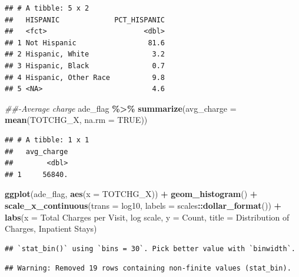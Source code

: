 \documentclass[preprint, 3p,
authoryear]{elsarticle} %
\newenvironment{Shaded}{\begin{snugshade}}{\end{snugshade}}
\newcommand{\CommentTok}[1]{\textcolor[rgb]{0.56,0.35,0.01}{\textit{#1}}}
\newcommand{\DataTypeTok}[1]{\textcolor[rgb]{0.13,0.29,0.53}{#1}}
\newcommand{\KeywordTok}[1]{\textcolor[rgb]{0.13,0.29,0.53}{\textbf{#1}}}
\newcommand{\NormalTok}[1]{#1}
\newcommand{\OperatorTok}[1]{\textcolor[rgb]{0.81,0.36,0.00}{\textbf{#1}}}
\newcommand{\OtherTok}[1]{\textcolor[rgb]{0.56,0.35,0.01}{#1}}
\newcommand{\StringTok}[1]{\textcolor[rgb]{0.31,0.60,0.02}{#1}}
\begin{document}
\begin{verbatim}
## # A tibble: 5 x 2
##   HISPANIC             PCT_HISPANIC
##   <fct>                       <dbl>
## 1 Not Hispanic                 81.6
## 2 Hispanic, White               3.2
## 3 Hispanic, Black               0.7
## 4 Hispanic, Other Race          9.8
## 5 <NA>                          4.6
\end{verbatim}

\begin{Shaded}
\begin{Highlighting}[]
\CommentTok{\#\#{-}Average charge  }
\NormalTok{ade\_flag }\OperatorTok{\%\textgreater{}\%}
\StringTok{    }\KeywordTok{summarize}\NormalTok{(}\DataTypeTok{avg\_charge =} \KeywordTok{mean}\NormalTok{(TOTCHG\_X, }\DataTypeTok{na.rm =} \OtherTok{TRUE}\NormalTok{))}
\end{Highlighting}
\end{Shaded}

\begin{verbatim}
## # A tibble: 1 x 1
##   avg_charge
##        <dbl>
## 1     56840.
\end{verbatim}

\begin{Shaded}
\begin{Highlighting}[]
\KeywordTok{ggplot}\NormalTok{(ade\_flag, }\KeywordTok{aes}\NormalTok{(}\DataTypeTok{x =}\NormalTok{ TOTCHG\_X)) }\OperatorTok{+}
\StringTok{  }\KeywordTok{geom\_histogram}\NormalTok{() }\OperatorTok{+}
\StringTok{  }\KeywordTok{scale\_x\_continuous}\NormalTok{(}\DataTypeTok{trans =} \StringTok{\textquotesingle{}log10\textquotesingle{}}\NormalTok{, }\DataTypeTok{labels =}\NormalTok{ scales}\OperatorTok{::}\KeywordTok{dollar\_format}\NormalTok{()) }\OperatorTok{+}
\StringTok{  }\KeywordTok{labs}\NormalTok{(}\DataTypeTok{x =} \StringTok{\textquotesingle{}Total Charges per Visit, log scale\textquotesingle{}}\NormalTok{, }\DataTypeTok{y =} \StringTok{\textquotesingle{}Count\textquotesingle{}}\NormalTok{, }\DataTypeTok{title =} \StringTok{\textquotesingle{}Distribution of Charges, Inpatient Stays\textquotesingle{}}\NormalTok{)}
\end{Highlighting}
\end{Shaded}

\begin{verbatim}
## `stat_bin()` using `bins = 30`. Pick better value with `binwidth`.
\end{verbatim}

\begin{verbatim}
## Warning: Removed 19 rows containing non-finite values (stat_bin).
\end{verbatim}
\end{document}
